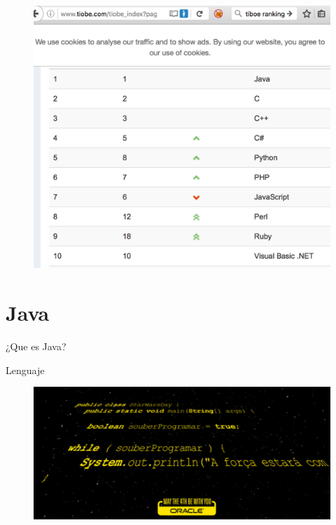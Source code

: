 \documentclass{beamer}
\begin{document}
\begin{frame}
	\begin{figure}
		\centering
		\includegraphics[width=0.9\linewidth]{Images/tiboe}
	\end{figure}
\end{frame}

\section{Java}
\begin{frame}
	\huge ¿Que es Java?
\end{frame}

\begin{frame}{Lenguaje}
	\begin{figure}
		\centering
		\includegraphics[width=0.9\linewidth]{Images/javalang}
	\end{figure}
\end{frame}
\end{document}
